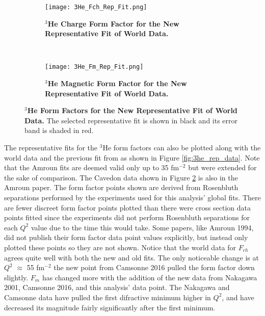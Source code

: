 \begin{figure}[!ht]
\begin{subfigure}{1.\textwidth}
  \centering
  \texttt{[image: 3He\_Fch\_Rep\_Fit.png]}
  \caption{\bf{$^3$He Charge Form Factor for the New Representative Fit of World Data.}}
  \label{fig:3he_fch_rep_fit}
\end{subfigure}\\
\begin{subfigure}{1.\textwidth}
  \centering
  \texttt{[image: 3He\_Fm\_Rep\_Fit.png]}
  \caption{\bf{$^3$He Magnetic Form Factor for the New Representative Fit of World Data.}}
  \label{fig:3he_fm_rep_fit}
\end{subfigure}
\caption[$^3$He Form Factors for the New Representative Fit of World Data] {
{\bf{$^3$He Form Factors for the New Representative Fit of World Data.}} The selected representative fit is shown in black and its error band is shaded in red.}
\label{fig:3he_rep_fit}
\end{figure}

The representative fits for the $^3$He form factors can also be plotted along with the world data and the previous fit from \cite{Article:Amroun} as shown in Figure \ref{fig:3he_rep_data}. Note that the Amroun fits are deemed valid only up to 35 fm$^{-2}$ but were extended for the sake of comparison. The Cavedon data \cite{Article:Cavedon} shown in Figure \ref{fig:3he_fm_rep_fit} is also in the Amroun paper. The form factor points shown are derived from Rosenbluth separations performed by the experiments used for this analysis' global fits. There are fewer discreet form factor points plotted than there were cross section data points fitted since the experiments did not perform Rosenbluth separations for each $Q^2$ value due to the time this would take. Some papers, like Amroun 1994, did not publish their form factor data point values explicitly, but instead only plotted these points so they are not shown. Notice that the world data for $F_{ch}$ agrees quite well with both the new and old fits. The only noticeable change is at $Q^2$ $\approx$ 55 fm$^{-2}$ the new point from Camsonne 2016 pulled the form factor down slightly. $F_m$ has changed more with the addition of the new data from Nakagawa 2001, Camsonne 2016, and this analysis' data point. The Nakagawa and Camsonne data have pulled the first difractive minimum higher in $Q^2$, and have decreased its magnitude fairly significantly after the first minimum.

